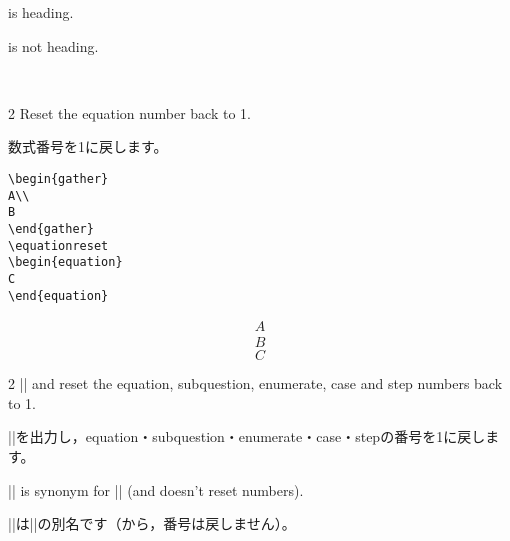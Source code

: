 \documentclass[%
fleqn,%
paper=a4paper,%
fontsize=10pt,%
open_bracket_pos=zenkakunibu_nibu,%
hanging_punctuation,%
]%
{jlreq}
\newenvironment{translateing}%
{\begin{multicolpar}{2}}
{\end{multicolpar}\vspace{\baselineskip}}
\DeclareRobustCommand{\commandtojskip}{\hspace{2.40554pt plus 1.49994pt minus 0.59998pt}}
\begin{document}
\begin{macroexample}
\setlength{\parindent}{1em}
\squareauto is heading.

\squareauto* is not heading.

\enumerateauto\enumerateauto\enumeratekeep\enumeratekeep%
\enumerateauto\label{test}\enumerateauto\enumerateauto%
\enumeratereset\enumerateauto\enumerateauto\enumerateauto
\enumeratereset\enumerateauto{}

\questionauto\subquestionauto\subquestionauto\\
\caseauto\caseauto\caseauto\caseauto
\stepauto\stepauto\stepauto\stepauto
\end{macroexample}

\macroexplanation{\equationreset}

\begin{translateing}
Reset the equation number back to 1.

数式番号を1に戻します。
\end{translateing}

\begin{lstlisting}
\begin{gather}
A\\
B
\end{gather}
\equationreset
\begin{equation}
C
\end{equation}
\end{lstlisting}

\begin{macroexample}
\begin{gather}
A\\
B
\end{gather}
\equationreset
\begin{equation}
C
\end{equation}
\end{macroexample}

\macroexplanation{\question}

\begin{translateing}
|\questionauto| and reset the equation, subquestion, enumerate, case and step numbers back to 1.

|\questionauto|を出力し，equation・subquestion・enumerate・case・stepの番号を1に戻します。

|\question*| is synonym for |\questionauto*| (and doesn't reset numbers).

|\question*|\commandtojskip は\commandtojskip|\questionauto*|\commandtojskip の別名です（から，番号は戻しません）。
\end{translateing}
\end{document}

